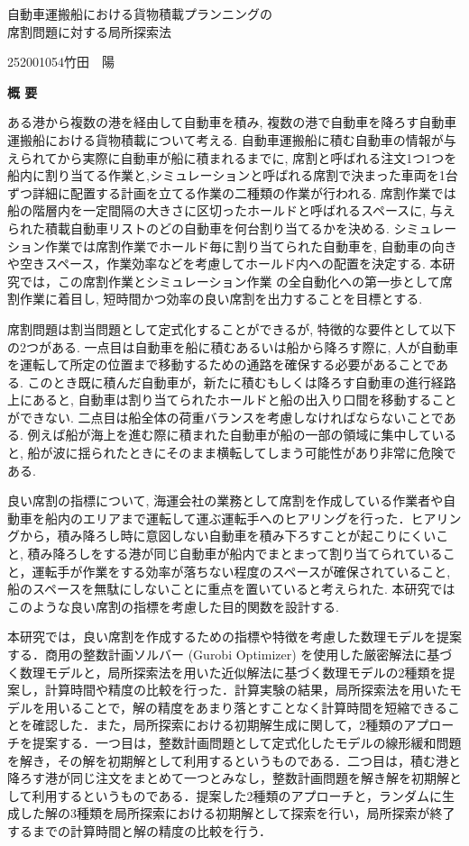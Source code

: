 \begin{center}
{\LARGE 自動車運搬船における貨物積載プランニングの\\席割問題に対する局所探索法}\\[0.5cm]
\end{center}
\hfill
{\large 252001054\qquad 竹田　陽}\\[0.5cm]
\begin{center}
{\Large \bf 概 要}\\
\end{center}

ある港から複数の港を経由して自動車を積み, 複数の港で自動車を降ろす自動車運搬船における貨物積載について考える. 自動車運搬船に積む自動車の情報が与えられてから実際に自動車が船に積まれるまでに, 席割と呼ばれる注文1つ1つを船内に割り当てる作業と,シミュレーションと呼ばれる席割で決まった車両を1台ずつ詳細に配置する計画を立てる作業の二種類の作業が行われる. 席割作業では船の階層内を一定間隔の大きさに区切ったホールドと呼ばれるスペースに, 与えられた積載自動車リストのどの自動車を何台割り当てるかを決める. シミュレーション作業では席割作業でホールド毎に割り当てられた自動車を, 自動車の向きや空きスペース，作業効率などを考慮してホールド内への配置を決定する. 本研究では，この席割作業とシミュレーション作業 の全自動化への第一歩として席割作業に着目し, 短時間かつ効率の良い席割を出力することを目標とする.

席割問題は割当問題として定式化することができるが, 特徴的な要件として以下の2つがある. 一点目は自動車を船に積むあるいは船から降ろす際に, 人が自動車を運転して所定の位置まで移動するための通路を確保する必要があることである. このとき既に積んだ自動車が，新たに積むもしくは降ろす自動車の進行経路上にあると, 自動車は割り当てられたホールドと船の出入り口間を移動することができない. 二点目は船全体の荷重バランスを考慮しなければならないことである. 例えば船が海上を進む際に積まれた自動車が船の一部の領域に集中していると, 船が波に揺られたときにそのまま横転してしまう可能性があり非常に危険である.

良い席割の指標について, 海運会社の業務として席割を作成している作業者や自動車を船内のエリアまで運転して運ぶ運転手へのヒアリングを行った．ヒアリングから，積み降ろし時に意図しない自動車を積み下ろすことが起こりにくいこと, 積み降ろしをする港が同じ自動車が船内でまとまって割り当てられていること，運転手が作業をする効率が落ちない程度のスペースが確保されていること, 船のスペースを無駄にしないことに重点を置いていると考えられた. 本研究ではこのような良い席割の指標を考慮した目的関数を設計する.

本研究では，良い席割を作成するための指標や特徴を考慮した数理モデルを提案する．商用の整数計画ソルバー (Gurobi Optimizer) を使用した厳密解法に基づく数理モデルと，局所探索法を用いた近似解法に基づく数理モデルの2種類を提案し，計算時間や精度の比較を行った．計算実験の結果，局所探索法を用いたモデルを用いることで，解の精度をあまり落とすことなく計算時間を短縮できることを確認した．また，局所探索における初期解生成に関して，2種類のアプローチを提案する．一つ目は，整数計画問題として定式化したモデルの線形緩和問題を解き，その解を初期解として利用するというものである．二つ目は，積む港と降ろす港が同じ注文をまとめて一つとみなし，整数計画問題を解き解を初期解として利用するというものである．提案した2種類のアプローチと，ランダムに生成した解の3種類を局所探索における初期解として探索を行い，局所探索が終了するまでの計算時間と解の精度の比較を行う．
